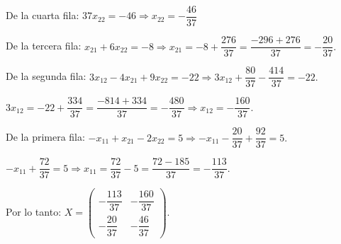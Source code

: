\begin{prob}
\begin{myproof}
De la cuarta fila: $37x_{22} = -46 \Rightarrow x_{22} = -\dfrac{46}{37}$

De la tercera fila: $x_{21} + 6x_{22} = -8 \Rightarrow x_{21} = -8 + \dfrac{276}{37} = \dfrac{-296+276}{37} = -\dfrac{20}{37}.$

De la segunda fila: $3x_{12} - 4x_{21} + 9x_{22} = -22\Rightarrow 3x_{12} + \dfrac{80}{37} - \dfrac{414}{37} = -22.$

$3x_{12} = -22 + \dfrac{334}{37} = \dfrac{-814+334}{37} = -\dfrac{480}{37}\Rightarrow x_{12} = -\dfrac{160}{37}.$

De la primera fila: $-x_{11} + x_{21} - 2x_{22} = 5\Rightarrow -x_{11} - \dfrac{20}{37} + \dfrac{92}{37} = 5.$

$-x_{11} + \dfrac{72}{37} = 5\Rightarrow x_{11} = \dfrac{72}{37} - 5 = \dfrac{72-185}{37} = -\dfrac{113}{37}.$

Por lo tanto: $X = \left( \begin{array}{cc}
-\dfrac{113}{37} & -\dfrac{160}{37} \\[6pt]
-\dfrac{20}{37} & -\dfrac{46}{37}
\end{array} \right).$
\end{myproof}
\end{prob}

